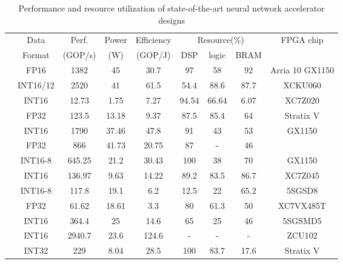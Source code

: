 \begin{table}[htbp]
    \centering
    \caption{Performance and resource utilization of state-of-the-art neural network accelerator designs}
    \begin{tabular}{|r|c|c|c|c|c|c|c|c|}
        \hline
        \multicolumn{1}{|c|}{} & Data  & Perf. & Power & Efficiency & \multicolumn{3}{c|}{Resource(\%)} & \multirow{2}[4]{*}{FPGA chip} \bigstrut\\
    \cline{6-8}    \multicolumn{1}{|c|}{} & Format & (GOP/s) & (W)   & (GOP/J) & DSP   & logic & BRAM  &  \bigstrut\\
        \hline
            \cite{aydonat2017opencl} & FP16  & 1382  & 45    & 30.7  & 97    & 58    & 92    & Arria 10 GX1150 \bigstrut[t]\\ \hline
            \cite{han2017ese} & INT16/12 & 2520  & 41    & 61.5  & 54.4  & 88.6  & 87.7  & XCKU060 \\ \hline
            \cite{venieris2017fpgaconvnet} & INT16 & 12.73 & 1.75  & 7.27  & 94.54 & 66.64 & 6.07  & XC7Z020 \\ \hline
            \cite{zhang2017frequency} & FP32  & 123.5 & 13.18 & 9.37  & 87.5  & 85.4  & 64    & Stratix V \\ \hline
            \multicolumn{1}{|c|}{\multirow{2}[2]{*}{\cite{zhang2017improving}}} & INT16 & 1790  & 37.46 & 47.8  & 91    & 43    & 53    & \multirow{2}[2]{*}{GX1150}\\
            \cline{2-8}    \multicolumn{1}{|c|}{} & FP32  & 866   & 41.73 & 20.75 & 87    & -     & 46    &  \\ \hline
            \cite{ma2017optimizing} & INT16-8 & 645.25 & 21.2  & 30.43 & 100   & 38    & 70    & GX1150 \\ \hline
            \cite{qiu2016going} & INT16 & 136.97 & 9.63  & 14.22 & 89.2  & 83.5  & 86.7  & XC7Z045 \\ \hline
            \cite{suda2016throughput} & INT16-8 & 117.8 & 19.1  & 6.2   & 12.5  & 22    & 65.2  & 5SGSD8 \\ \hline
            \cite{zhang2015optimizing} & FP32  & 61.62 & 18.61 & 3.3   & 80    & 61.3  & 50    & XC7VX485T \\ \hline
            \cite{guan2017fp} & INT16 & 364.4 & 25    & 14.6  & 65    & 25    & 46    & 5SGSMD5 \\ \hline
            \cite{lu2017evaluating} & INT16 & 2940.7 & 23.6  & 124.6 &   -   &   -   &   -   & ZCU102 \\ \hline
            \cite{podili2017fast} & INT32 & 229   & 8.04  & 28.5  & 100   & 83.7  & 17.6  & Stratix V \\ \hline

\end{tabular}
\end{table}
